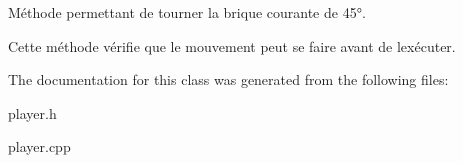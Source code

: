 Méthode permettant de tourner la brique courante de 45°. 

Cette méthode vérifie que le mouvement peut se faire avant de l\textquotesingle{}exécuter. 

The documentation for this class was generated from the following files\+:\begin{DoxyCompactItemize}
\item 
player.\+h\item 
player.\+cpp\end{DoxyCompactItemize}
